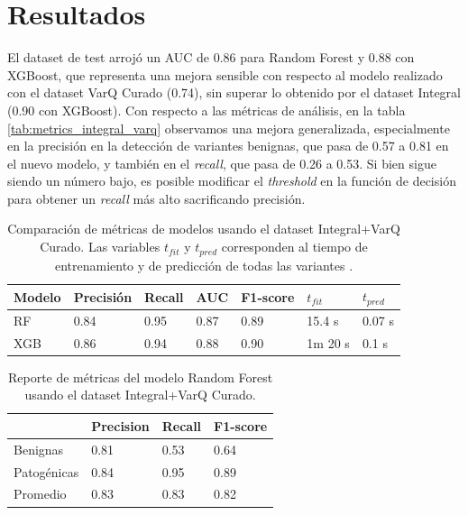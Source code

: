 \section{Resultados}
El dataset de test arrojó un AUC de 0.86 para Random Forest y 0.88 con XGBoost, que representa una mejora sensible con respecto al modelo realizado con el dataset VarQ Curado (0.74), sin superar lo obtenido por el dataset Integral (0.90 con XGBoost). Con respecto a las métricas de análisis, en la tabla \ref{tab:metrics_integral_varq} observamos una mejora generalizada, especialmente en la precisión en la detección de variantes benignas, que pasa de 0.57 a 0.81 en el nuevo modelo, y también en el \textit{recall}, que pasa de 0.26 a 0.53. Si bien sigue siendo un número bajo, es posible modificar el \textit{threshold} en la función de decisión para obtener un \textit{recall} más alto sacrificando precisión. 


\begin{table}[H]
\centering
\begin{tabular}{|l|l|l|l|l|l|l|}
\hline
Modelo & Precisión & Recall & AUC & F1-score & $t_{fit}$ & $t_{pred}$ \\ \hline
RF  & 0.84 & 0.95 & 0.87 & 0.89 & 15.4 s & 0.07 s \\ \hline
XGB & 0.86 & 0.94 & 0.88 & 0.90 & 1m 20 s & 0.1 s \\ \hline
\end{tabular}
\label{tab:metrics_model}

\caption{Comparación de métricas de modelos usando el dataset Integral+VarQ Curado. Las variables $t_{fit}$ y $t_{pred}$ corresponden al tiempo de entrenamiento y de predicción de todas las variantes .}
\end{table}


\begin{table}[H]
\centering
\begin{tabular}{|l|l|l|l|}
\hline
             & Precision & Recall & F1-score \\ \hline
Benignas     & 0.81      & 0.53   & 0.64     \\ \hline
Patogénicas  & 0.84      & 0.95   & 0.89     \\ \hline
Promedio     & 0.83      & 0.83   & 0.82     \\ \hline
\end{tabular}
\caption{Reporte de métricas del modelo Random Forest usando el dataset Integral+VarQ Curado.}
\label{tab:metrics_integral_varq_rf}
\end{table}


